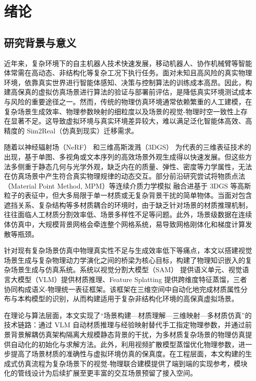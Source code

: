 ﻿%

\chapter{绪论}

\section{研究背景与意义}

近年来，复杂环境下的自主机器人技术快速发展，移动机器人、协作机械臂等智能体常需在高动态、非结构化等复杂工况下执行任务。面对未知且高风险的真实物理环境，依靠真实世界进行智能体感知、决策与控制算法的训练成本高昂。因此，构建高保真的虚拟仿真场景进行算法的验证与部署前评估，是降低真实环境测试成本与风险的重要途径之一。然而，传统的物理仿真环境通常依赖繁重的人工建模，在复杂场景生成效率、物理参数映射的细粒度以及场景的视觉-物理时空一致性上存在显著不足。这导致虚拟环境与真实环境差异较大，难以满足泛化智能体高效、高精度的 Sim2Real（仿真到现实）迁移需求。

随着以神经辐射场（NeRF）\cite{nerf} 和三维高斯泼溅（3DGS）\cite{3dgs} 为代表的三维表征技术的出现，基于单图、多视角或文本序列的高效场景外观生成得以快速发展。但这些方法多侧重于静态几何与光学外观，缺乏内在的质量、弹性、密度等力学属性，无法在仿真场景中产生符合真实物理规律的动态交互。部分前沿研究尝试将物质点法（Material Point Method, MPM）等连续介质力学模拟\cite{mpm} 融合进基于 3DGS 等高斯粒子的表征中\cite{physgaussian}，但大多局限于单一材质或无复杂背景干扰的简单物体。当面对包含遮挡关系、复杂结构等多材质耦合的环境时，由于缺乏针对场景的材质推理机制，往往面临人工材质分割效率低、场景多样性不足等问题。此外，场景级数据在连续体仿真中，大规模背景网格会牵连整个网格系统，易导致网格刚体化和梯度计算发散等瓶颈。

针对现有复杂场景仿真中物理真实性不足与生成效率低下等痛点，本文以搭建视觉场景生成与复杂物理动力学演化之间的桥梁为核心目标，构建了物理知识嵌入的复杂场景生成与仿真系统。系统以视觉分割大模型（SAM）\cite{sam} 提供语义单元、视觉语言大模型（VLM）提供材质推理、Feature Splatting\cite{featuresplatting} 提供跨维度特征蒸馏，三者协同构成语义-物理统一表征框架。该框架在三维空间中自动化地完成材质属性分布与本构模型的识别，从而构建适用于复杂非结构化环境的高保真虚拟场景。

在理论与算法层面，本文实现了“场景构建—材质理解—三维映射—多材质仿真”的技术链路：通过 VLM 自动材质推理与经验映射替代手工指定物理参数，并通过前景背景解耦仿真架构隔离大规模静态背景的干扰，为多材质复杂场景的物理仿真提供自动化的初始化与求解方法。此外，利用视频扩散模型蒸馏优化物理参数，进一步提高了场景材质的准确性与虚拟环境仿真的保真度。在工程层面，本文构建的生成式仿真流程为复杂场景下的视觉-物理联合建模提供了端到端的实现参考，模块化的管线设计为后续扩展至更丰富的交互场景预留了接入空间。

